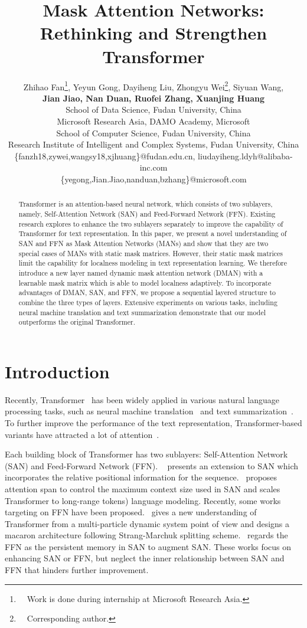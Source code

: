 \documentclass[11pt]{article}
\title{Mask Attention Networks: Rethinking and Strengthen Transformer}
\author{Zhihao Fan\thanks{~~Work is done during internship at Microsoft Research Asia.}, Yeyun Gong, Dayiheng Liu, Zhongyu Wei\thanks{~~Corresponding author.}, Siyuan Wang, \\
\textbf{Jian Jiao}\textbf{, Nan Duan}\textbf{, Ruofei Zhang}\textbf{, Xuanjing Huang}\\
School of Data Science, Fudan University, China\\
Microsoft Research Asia, DAMO Academy, Microsoft \\
School of Computer Science, Fudan University, China\\
Research Institute of Intelligent and Complex Systems, Fudan University, China\\
\{fanzh18,zywei,wangsy18,xjhuang\}@fudan.edu.cn, liudayiheng.ldyh@alibaba-inc.com\\
\{yegong,Jian.Jiao,nanduan,bzhang\}@microsoft.com
}
\begin{document}
\maketitle
\begin{abstract}
Transformer is an attention-based neural network, which consists of two sublayers, namely, Self-Attention Network (SAN) and Feed-Forward Network (FFN). Existing research explores to enhance the two sublayers separately to improve the capability of Transformer for text representation. In this paper, we present a novel understanding of SAN and FFN as Mask Attention Networks (MANs) and show that they are two special cases of MANs with static mask matrices. However, their static mask matrices limit the capability for localness modeling in text representation learning. We therefore introduce a new layer named dynamic mask attention network (DMAN) with a learnable mask matrix which is able to model localness adaptively. To incorporate advantages of DMAN, SAN, and FFN, we propose a sequential layered structure to combine the three types of layers. Extensive experiments on various tasks, including neural machine translation and text summarization demonstrate that our model outperforms the original Transformer.
\end{abstract}



\section{Introduction}
Recently, Transformer~\cite{vaswani2017attention} has been widely applied in various natural language processing tasks, such as neural machine translation~\cite{vaswani2017attention} and text summarization~\cite{zhang2019pretraining}. To further improve the performance of the text representation, Transformer-based variants have attracted a lot of attention~\cite{lu2019understanding,sukhbaatar2019adaptive,sukhbaatar2019augmenting,bugliarello2019improving,ma2019monotonic}. 

Each building block of Transformer has two sublayers: Self-Attention Network (SAN) and Feed-Forward Network (FFN).
~\citet{shaw2018self} presents an extension to SAN which incorporates the relative positional information for the sequence.~\citet{sukhbaatar2019adaptive} proposes attention span to control the maximum context size used in SAN and scales Transformer to long-range  tokens) language modeling. Recently, some works targeting on FFN have been proposed.~\citet{lu2019understanding} gives a new understanding of Transformer from a multi-particle dynamic system point of view and designs a macaron architecture following Strang-Marchuk splitting scheme.~\citet{sukhbaatar2019augmenting} regards the FFN as the persistent memory in SAN to augment SAN. These works focus on enhancing SAN or FFN, but neglect the inner relationship between SAN and FFN that hinders further improvement. 
\end{document}
